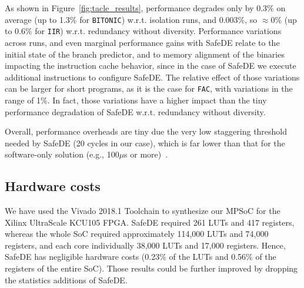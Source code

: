 As shown in Figure~\ref{fig:tacle_results}, performance degrades only by 0.3\% on average (up to 1.3\% for \texttt{BITONIC}) w.r.t. isolation runs, and 0.003\%, so $\approx$0\% (up to 0.6\% for \texttt{IIR}) w.r.t. redundancy without diversity.
Performance variations across runs, and even marginal performance gains with SafeDE relate to the initial state of the branch predictor, and to memory alignment of the binaries impacting the instruction cache behavior, since in the case of SafeDE we execute additional instructions to configure SafeDE. The relative effect of those variations can be larger for short programs, as it is the case for \texttt{FAC}, with variations in the range of 1\%. In fact, those variations have a higher impact than the tiny performance degradation of SafeDE w.r.t. redundancy without diversity.

Overall, performance overheads are tiny due the very low staggering threshold needed by SafeDE (20 cycles in our case), which is far lower than that for the software-only solution (e.g., 100$\mu$s or more)~\cite{SergiDFT}.

\subsection{Hardware costs}

We have used the Vivado 2018.1 Toolchain to synthesize our MPSoC for the Xilinx UltraScale KCU105 FPGA. SafeDE required 261 LUTs and 417 registers, whereas the whole SoC required approximately 114,000 LUTs and 74,000 registers, and each core individually 38,000 LUTs and 17,000 registers. Hence, SafeDE has negligible hardware costs (0.23\% of the LUTs and 0.56\% of the registers of the entire SoC). Those results could be further improved by dropping the statistics additions of SafeDE.
